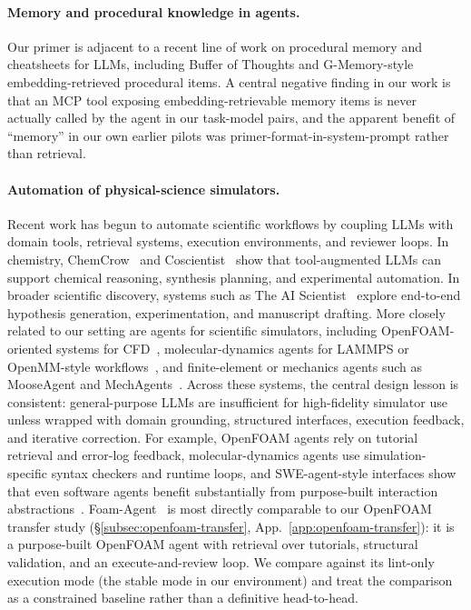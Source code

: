 \documentclass{article}
\begin{document}
\paragraph{Memory and procedural knowledge in agents.}
Our primer is adjacent to a recent line of work on procedural memory and cheatsheets for LLMs, including Buffer of Thoughts \cite{yang2024bot} and G-Memory-style embedding-retrieved procedural items. A central negative finding in our work is that an MCP tool exposing embedding-retrievable memory items is never actually called by the agent in our task-model pairs, and the apparent benefit of ``memory'' in our own earlier pilots was primer-format-in-system-prompt rather than retrieval.

\paragraph{Automation of physical-science simulators.}
Recent work has begun to automate scientific workflows by coupling LLMs with domain tools, retrieval systems, execution environments, and reviewer loops. In chemistry, ChemCrow~\cite{bran2024chemcrow} and Coscientist~\cite{boiko2023coscientist} show that tool-augmented LLMs can support chemical reasoning, synthesis planning, and experimental automation. In broader scientific discovery, systems such as The AI Scientist~\cite{lu2024aiscientist,yamada2025ai} explore end-to-end hypothesis generation, experimentation, and manuscript drafting. More closely related to our setting are agents for scientific simulators, including OpenFOAM-oriented systems for CFD~\cite{chen2024metaopenfoam,pandey2025openfoamgpt,foamagent2025}, molecular-dynamics agents for LAMMPS or OpenMM-style workflows~\cite{kim2024mdagents,shi2026mdagent2,guilbert2025dynamate,zhao2026polyjarvis}, and finite-element or mechanics agents such as MooseAgent and MechAgents~\cite{zhan2025mooseagent,ni2024mechagents}. Across these systems, the central design lesson is consistent: general-purpose LLMs are insufficient for high-fidelity simulator use unless wrapped with domain grounding, structured interfaces, execution feedback, and iterative correction. For example, OpenFOAM agents rely on tutorial retrieval and error-log feedback, molecular-dynamics agents use simulation-specific syntax checkers and runtime loops, and SWE-agent-style interfaces show that even software agents benefit substantially from purpose-built interaction abstractions~\cite{yang2024sweagent}. Foam-Agent~\cite{foamagent2025} is most directly comparable to our OpenFOAM transfer study (\S\ref{subsec:openfoam-transfer}, App.~\ref{app:openfoam-transfer}): it is a purpose-built OpenFOAM agent with retrieval over tutorials, structural validation, and an execute-and-review loop. We compare against its lint-only execution mode (the stable mode in our environment) and treat the comparison as a constrained baseline rather than a definitive head-to-head.
\end{document}
